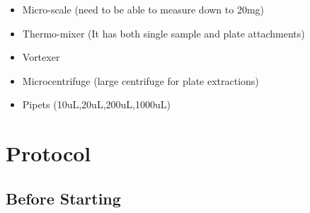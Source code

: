 \documentclass[
  letterpaper,
  DIV=11,
  numbers=noendperiod]{scrreprt}
\begin{document}
\begin{itemize}
\item
  Micro-scale (need to be able to measure down to 20mg)
\item
  Thermo-mixer (It has both single sample and plate attachments)
\item
  Vortexer
\item
  Microcentrifuge (large centrifuge for plate extractions)
\item
  Pipets (10uL,20uL,200uL,1000uL)
\end{itemize}

\hypertarget{protocol-1}{%
\section*{\texorpdfstring{\textbf{Protocol}}{Protocol}}\label{protocol-1}}

\hypertarget{before-starting}{%
\subsection*{\texorpdfstring{\textbf{Before
Starting}}{Before Starting}}\label{before-starting}}
\end{document}
